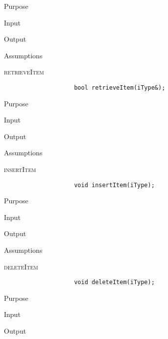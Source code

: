 \documentclass[pdftex, 12pt]{article}
\begin{document}
\begin{description}
\begin{description}
\begin{description}
\begin{description}
					\item{Purpose}

					\item{Input}

					\item{Output}

					\item{Assumptions}

				\end{description}
			\item{\textsc{retrieveItem}}
				\begin{lstlisting}
					bool retrieveItem(iType&);
				\end{lstlisting}
				\begin{description}

					\item{Purpose}

					\item{Input}

					\item{Output}

					\item{Assumptions}

				\end{description}
			\item{\textsc{insertItem}}
				\begin{lstlisting}
					void insertItem(iType);
				\end{lstlisting}
				\begin{description}

					\item{Purpose}

					\item{Input}

					\item{Output}

					\item{Assumptions}

				\end{description}
			\item{\textsc{deleteItem}}
				\begin{lstlisting}
					void deleteItem(iType);
				\end{lstlisting}
				\begin{description}

					\item{Purpose}

					\item{Input}

					\item{Output}


\end{description}
\end{description}
\end{description}
\end{description}
\end{document}
